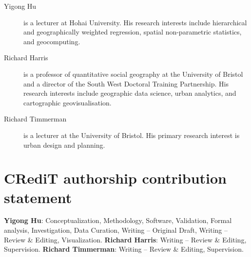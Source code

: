 \documentclass[times]{interact}
\theoremstyle{plain}%
\theoremstyle{definition}
\theoremstyle{remark}
\begin{document}
\begin{description}
\item[Yigong Hu] is a lecturer at Hohai University. His research interests include hierarchical and geographically weighted regression, spatial non-parametric statistics, and geocomputing.

\item[Richard Harris] is a professor of quantitative social geography at the University of Bristol and a director of the South West Doctoral Training Partnership. His research interests include geographic data science, urban analytics, and cartographic geovisualisation.

\item[Richard Timmerman] is a lecturer at the University of Bristol. His primary research interest is urban design and planning.
\end{description}

\section*{CRediT authorship contribution statement}

\textbf{Yigong Hu}: Conceptualization, Methodology, Software, Validation, Formal analysis, Investigation, Data Curation, Writing – Original Draft, Writing – Review \& Editing, Visualization.
\textbf{Richard Harris}: Writing – Review \& Editing, Supervision.
\textbf{Richard Timmerman}: Writing – Review \& Editing, Supervision.


 

\end{document}
